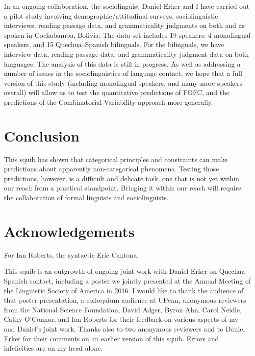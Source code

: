\documentclass[output=paper]{langsci/langscibook}
\begin{document}
In an ongoing collaboration, the sociolinguist Daniel Erker
and I have carried out a pilot study involving demographic/attitudinal surveys,
sociolinguistic interviews, reading passage data, and grammaticality judgments
on both  and  as spoken in Cochabamba, Bolivia.  The data set
includes 19 speakers: 4 monolingual  speakers, and 15 Quechua--Spanish
bilinguals.  For the bilinguals, we have interview data, reading passage data,
and grammaticality judgment data on both languages.     The analysis of this
data is still in progress.  As well as addressing a number of issues in the
sociolinguistics of language contact, we hope that a full version of this study
(including monolingual  speakers, and many more speakers overall) will
allow us to test the quantitative predictions of FOFC, and the predictions of
the Combinatorial Variability approach more generally.

\section{Conclusion}\label{sec-30:key:4}

This squib has shown that categorical principles and constraints can make
predictions about apparently non-categorical phenomena.  Testing those
predictions, however, is a difficult and delicate task, one that is not yet
within our reach from a practical standpoint.  Bringing it within our reach
will require the collaboration of formal linguists and sociolinguists.

\printchapterglossary{}

\section*{Acknowledgements}

For Ian Roberts, the syntactic Eric Cantona.

This squib is an outgrowth of ongoing joint work with Daniel Erker on
Quechua--Spanish contact, including a poster we jointly presented at the Annual
Meeting of the Linguistic Society of America in 2016. I would like to thank the
audience of that poster presentation, a colloquium audience at UPenn, anonymous
reviewers from the National Science Foundation, David Adger, Byron Ahn, Carol
Neidle, Cathy O’Connor, and Ian Roberts for their feedback on various aspects
of my and Daniel’s joint work. Thanks also to two anonymous reviewers and to
Daniel Erker for their comments on an earlier version of this squib. Errors and
infelicities are on my head alone.

{\sloppy
\printbibliography[heading=subbibliography,notkeyword=this]
}
\end{document}
